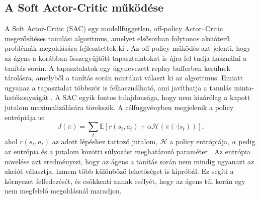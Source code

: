 \documentclass[12pt,a4paper]{report}
\begin{document}
	\subsection{A Soft Actor-Critic működése}
	A Soft Actor-Critic (SAC) egy modellfüggetlen, off-policy Actor--Critic megerősítéses tanulási algoritmus, amelyet elsősorban folytonos akcióterű problémák megoldására fejlesztettek ki \cite{haarnoja2018sac}.
	\newline
	\newline
	Az off-policy működés azt jelenti, hogy az ágens a korábban összegyűjtött tapasztalatokat is újra fel tudja használni a tanítás során. A tapasztalatok egy úgynevezett replay bufferben kerülnek tárolásra, amelyből a tanítás során mintákat választ ki az algoritmus. Emiatt ugyanaz a tapasztalat többször is felhasználható, ami javíthatja a tanulás minta-hatékonyságát \cite{haarnoja2018sac}.
	\newline
	\newline
	A SAC egyik fontos tulajdonsága, hogy nem kizárólag a kapott jutalom maximalizálására törekszik. A célfüggvényben megjelenik a policy entrópiája is:
	\begin{equation}
		J(\pi)
		=
		\sum_t
		\mathbb{E}
		\left[
		r(s_t,a_t)
		+
		\alpha
		\mathcal{H}
		\left(
		\pi(\cdot|s_t)
		\right)
		\right],
	\end{equation}
	ahol $r(s_t,a_t)$ az adott lépéshez tartozó jutalom, $\mathcal{H}$ a policy entrópiája, $\alpha$ pedig az entrópia és a jutalom közötti súlyozást meghatározó paraméter \cite{haarnoja2018sac}.
	\newline
	\newline
	Az entrópia növelése azt eredményezi, hogy az ágens a tanítás során nem mindig ugyanazt az akciót választja, hanem több különböző lehetőséget is kipróbál. Ez segíti a környezet felfedezését, és csökkenti annak esélyét, hogy az ágens túl korán egy nem megfelelő megoldásnál maradjon.
	
\end{document}
